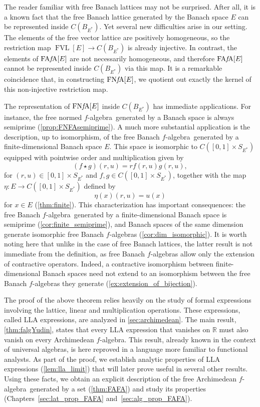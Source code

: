 \documentclass{memo-l}
\theoremstyle{definition}
\theoremstyle{remark}
\numberwithin{section}{chapter}
\numberwithin{equation}{chapter}
\newcommand\R{\ensuremath{\mathbb{R}}}
\newcommand{\falg}{$f\!$-algebra}
\newcommand{\FAFAv}[1]{\operatorname{FA{\it f}\!A}[#1]}
\newcommand{\FNFA}[1]{\operatorname{FN{\it f}\!A}[#1]}
\newcommand{\FVLv}[1]{\operatorname{FVL}[#1]}
\begin{document}
The reader familiar with free Banach lattices may not be surprised. After all, it is a known fact that the free Banach lattice generated by the Banach space $E$ can be represented
inside $C(B_{E^{*}})$. Yet several new difficulties arise in our setting. The elements of the free vector
lattice are positively homogeneous, so the restriction map $\FVLv E\to
C(B_{E^{*}})$ is already injective. In contrast, the elements of $\FAFAv E$ are not necessarily
homogeneous, and therefore $\FAFAv E$ cannot be represented inside
$C(B_{E^{*}})$ via this map. It is a remarkable coincidence that, in
constructing $\FNFA E$, we quotient out exactly the kernel of this
non-injective restriction map.

The representation of $\FNFA E$ inside $C(B_{E^{*}})$ has immediate applications. For instance, the free normed
\falg\ generated by a Banach space is always semiprime
(\cref{prop:FNFAsemiprime}). A much more substantial application is the
description, up to isomorphism, of the free Banach \falg\ generated by
a finite-dimensional Banach space $E$. This space is isomorphic to
$C([0,1]\times S_{E^{*}})$ equipped with pointwise order and multiplication given by
\[
    (f\star g)(r,u)=rf(r,u)g(r,u),
\]
for $(r,u)\in [0,1]\times S_{E^{*}}$ and $f,g \in C([0,1]\times
S_{E^{*}})$, together with the map $\eta \colon E\to C([0,1]\times
S_{E^{*}})$ defined by 
\[
\eta (x)(r,u)=u(x)
\]
for $x \in E$ (\cref{thm:finite}). This characterization has important consequences:
the free Banach \falg\ generated by a finite-dimensional Banach space
is semiprime (\cref{cor:finite_semiprime}), and Banach spaces of the
same dimension generate isomorphic free Banach \falg s
(\cref{cor:dim_isomorphic}). It is worth noting here that unlike in the case of free Banach
lattices, the latter result is not immediate from the definition,
as free Banach \falg s allow only the extension of contractive operators. Indeed, a
contractive isomorphism between finite-dimensional Banach spaces need
not extend to an isomorphism between the free Banach \falg s they
generate (\cref{ex:extension_of_bijection}).

The proof of the above theorem relies heavily on the study of formal
expressions involving the lattice, linear and multiplication operations. These expressions, called LLA expressions, are analyzed in
\cref{sec:archimedean}. The main result, \cref{thm:falgYudin}, states
that every LLA expression that vanishes on $\R$ must also vanish on
every Archimedean \falg. This result, already known in the context of
universal algebras, is here reproved in a language more familiar to
functional analysts. As part of the proof, we establish analytic
properties of LLA expressions (\cref{lem:lla_limit}) that will later
prove useful in several other results. Using these facts, we obtain an
explicit description of the free Archimedean \falg\ generated by a set
(\cref{thm:FAFA}) and study its properties
(Chapters~\ref{sec:lat_prop_FAFA} and~\ref{sec:alg_prop_FAFA}).
\end{document}
